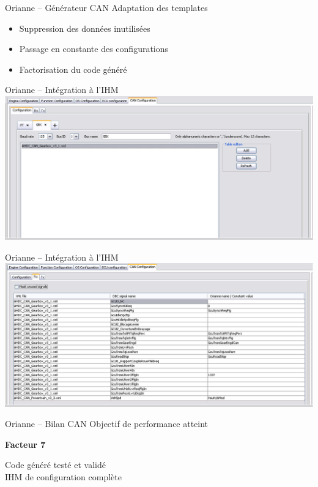 \documentclass[xcolor=x11names,compress]{beamer}
\begin{document}
\begin{frame}{Orianne -- Générateur CAN}
  Adaptation des templates
  \begin{itemize}
	\item Suppression des données inutilisées
	\item Passage en constante des configurations
	\item Factorisation du code généré
  \end{itemize}
\end{frame}

\begin{frame}{Orianne -- Intégration à l'IHM}
  \centering
  \includegraphics[scale=0.3]{images/ihmcan_conf}
\end{frame}

\begin{frame}{Orianne -- Intégration à l'IHM}
  \centering
  \includegraphics[scale=0.3]{images/ihmcan_signal}
\end{frame}

\begin{frame}{Orianne -- Bilan CAN}
  Objectif de performance atteint
  \begin{center}
	{\large {\bf Facteur 7}}
  \end{center}
  Code généré testé et validé\\
  \vfill
  IHM de configuration complète
\end{frame}
\end{document}
